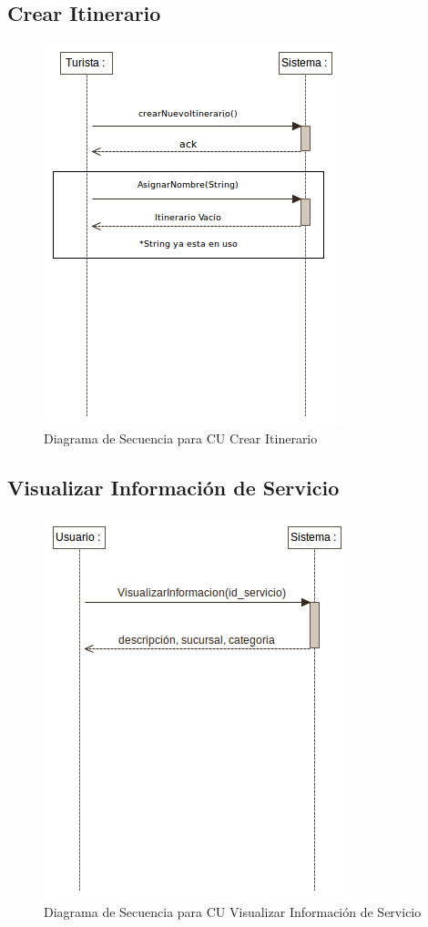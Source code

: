 \documentclass[12pt]{article}
\begin{document}
\subsection{Crear Itinerario}
\begin{figure}[htp]
\centering
\includegraphics[scale=0.50]{Diagramas/Secuencia/crear_itinerario.png}
\caption{Diagrama de Secuencia para CU Crear Itinerario}
\label{}
\end{figure}
\subsection{Visualizar Información de Servicio}
\begin{figure}[htp]
\centering
\includegraphics[scale=0.50]{Diagramas/Secuencia/visualizar_info_servicio.png}
\caption{Diagrama de Secuencia para CU Visualizar Información de Servicio}
\label{}
\end{figure}
\newpage
\end{document}
